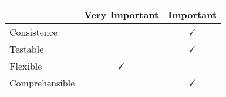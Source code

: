 \begin{frame}
\tiny
\begin{figure}[]
		\begin{tabular}{| l | m{} | m{}|} \hline
 & Very  Important& Important \\ \hline

Consistence  				&& \multicolumn{1}{c|}{$\checkmark$} 		\\ \hline
Testable  					&& \multicolumn{1}{c|}{$\checkmark$} 		\\ \hline
Flexible  					& \multicolumn{1}{c|}{$\checkmark$} 		\\ \hline
Comprehensible  		&& \multicolumn{1}{c|}{$\checkmark$} 		\\ \hline
	
		\end{tabular}
	\label{fig:prioritizedCrit}
\end{figure}

\end{frame}